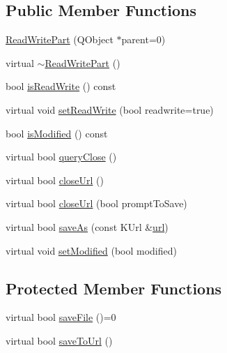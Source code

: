 \subsection*{\-Public \-Member \-Functions}
\begin{DoxyCompactItemize}
\item 
\hyperlink{classKParts_1_1ReadWritePart_a5444a248f62fa73ab6461dbbaed30054}{\-Read\-Write\-Part} (\-Q\-Object $\ast$parent=0)
\item 
virtual \hyperlink{classKParts_1_1ReadWritePart_a05e99804f15b4b8941fd026481cc74b2}{$\sim$\-Read\-Write\-Part} ()
\item 
bool \hyperlink{classKParts_1_1ReadWritePart_a1f77bd8acc3596f59cd07fa7918dafb1}{is\-Read\-Write} () const 
\item 
virtual void \hyperlink{classKParts_1_1ReadWritePart_a5b8c2d4b35739c882dc67f0acf8096c2}{set\-Read\-Write} (bool readwrite=true)
\item 
bool \hyperlink{classKParts_1_1ReadWritePart_a61acb87afb71c5cd7dcce295693e22e4}{is\-Modified} () const 
\item 
virtual bool \hyperlink{classKParts_1_1ReadWritePart_acdf38bc8da8b88a6ba38f9a3129d0c77}{query\-Close} ()
\item 
virtual bool \hyperlink{classKParts_1_1ReadWritePart_a45ed4bb6df997d6db0eae0d63f66b050}{close\-Url} ()
\item 
virtual bool \hyperlink{classKParts_1_1ReadWritePart_ac9d11b897ccf15ada8d15dd55eae3e3f}{close\-Url} (bool prompt\-To\-Save)
\item 
virtual bool \hyperlink{classKParts_1_1ReadWritePart_a5b10d70c83095f525b92fa5c9b554826}{save\-As} (const \-K\-Url \&\hyperlink{classKParts_1_1ReadOnlyPart_a5b8edbf05a338814287496882adde559}{url})
\item 
virtual void \hyperlink{classKParts_1_1ReadWritePart_ae8171d17ef8cf7f51a0607fa8a5df7d0}{set\-Modified} (bool modified)
\end{DoxyCompactItemize}
\subsection*{\-Protected \-Member \-Functions}
\begin{DoxyCompactItemize}
\item 
virtual bool \hyperlink{classKParts_1_1ReadWritePart_a599af24081c3dc1c261c04dce1de4f41}{save\-File} ()=0
\item 
virtual bool \hyperlink{classKParts_1_1ReadWritePart_affb719d6b8951cb1f3986b92db9527fe}{save\-To\-Url} ()
\end{DoxyCompactItemize}


